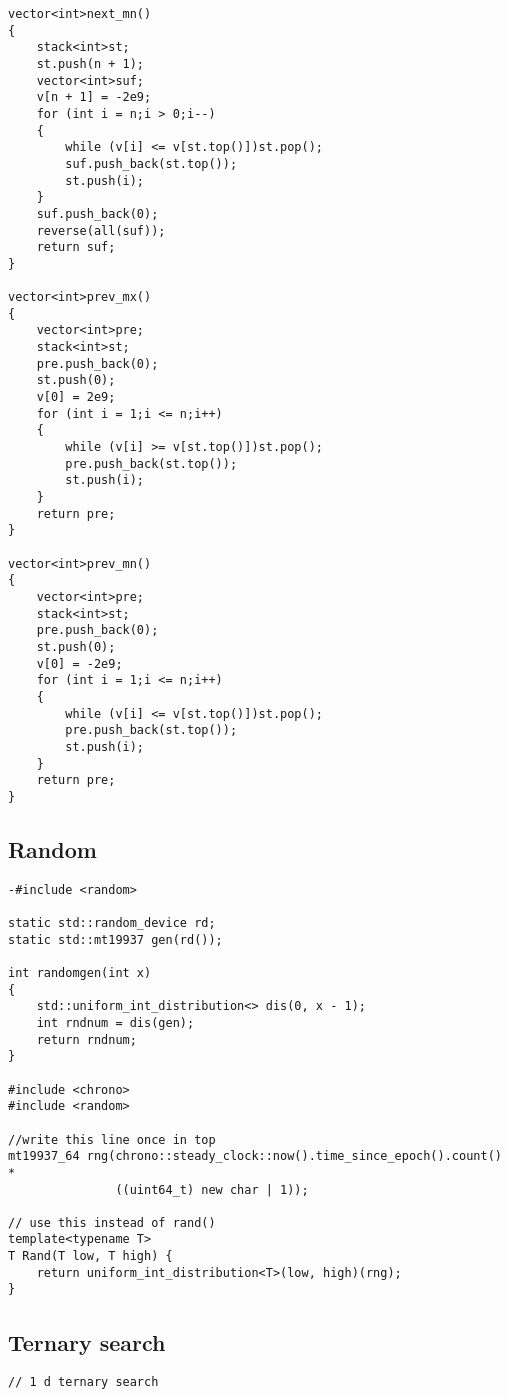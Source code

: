 \documentclass{article}
\begin{document}
{\begin{verbatim}
vector<int>next_mn()
{
	stack<int>st;
	st.push(n + 1);
	vector<int>suf;
	v[n + 1] = -2e9;
	for (int i = n;i > 0;i--)
	{
		while (v[i] <= v[st.top()])st.pop();
		suf.push_back(st.top());
		st.push(i);
	}
	suf.push_back(0);
	reverse(all(suf));
	return suf;
}

vector<int>prev_mx()
{
	vector<int>pre;
	stack<int>st;
	pre.push_back(0);
	st.push(0);
	v[0] = 2e9;
	for (int i = 1;i <= n;i++)
	{
		while (v[i] >= v[st.top()])st.pop();
		pre.push_back(st.top());
		st.push(i);
	}
	return pre;
}

vector<int>prev_mn()
{
	vector<int>pre;
	stack<int>st;
	pre.push_back(0);
	st.push(0);
	v[0] = -2e9;
	for (int i = 1;i <= n;i++)
	{
		while (v[i] <= v[st.top()])st.pop();
		pre.push_back(st.top());
		st.push(i);
	}
	return pre;
}
\end{verbatim}

\subsection{Random}
\begin{verbatim}
-#include <random>  
  
static std::random_device rd;  
static std::mt19937 gen(rd());  
  
int randomgen(int x)  
{  
    std::uniform_int_distribution<> dis(0, x - 1);  
    int rndnum = dis(gen);  
    return rndnum;  
}

#include <chrono>  
#include <random>  
  
//write this line once in top  
mt19937_64 rng(chrono::steady_clock::now().time_since_epoch().count() *  
               ((uint64_t) new char | 1));  
  
// use this instead of rand()  
template<typename T>  
T Rand(T low, T high) {  
    return uniform_int_distribution<T>(low, high)(rng);  
}
\end{verbatim}

\subsection{Ternary search}
\begin{verbatim}
// 1 d ternary search


\end{verbatim}}
\end{document}
